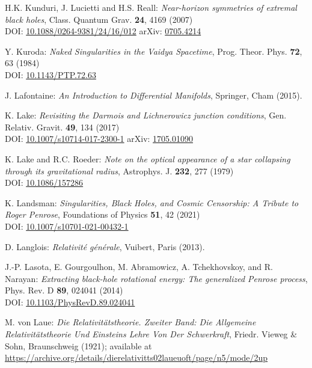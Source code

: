 \begin{thebibliography}{123}
H.K. Kunduri, J. Lucietti and H.S. Reall:
{\em Near-horizon symmetries of extremal black holes},
Class. Quantum Grav. {\bf 24}, 4169 (2007)\\
DOI: \href{https://doi.org/10.1088/0264-9381/24/16/012}{10.1088/0264-9381/24/16/012}\hfill
arXiv: \href{https://arxiv.org/abs/0705.4214}{0705.4214}

Y. Kuroda:
{\em Naked Singularities in the Vaidya Spacetime},
Prog. Theor. Phys. {\bf 72}, 63 (1984)\\
DOI: \href{https://doi.org/10.1143/PTP.72.63}{10.1143/PTP.72.63}

J. Lafontaine: {\em An Introduction to Differential Manifolds},
Springer, Cham (2015).

K. Lake:
{\em Revisiting the Darmois and Lichnerowicz junction conditions},
Gen. Relativ. Gravit. {\bf 49}, 134 (2017)\\
DOI: \href{https://doi.org/10.1007/s10714-017-2300-1}{10.1007/s10714-017-2300-1}\hfill
arXiv: \href{https://arxiv.org/abs/1705.01090}{1705.01090}

K. Lake and R.C. Roeder:
{\em Note on the optical appearance of a star collapsing through its gravitational radius},
Astrophys. J. {\bf 232}, 277 (1979)\\
DOI: \href{https://doi.org/10.1086/157286}{10.1086/157286}

K. Landsman:
{\em Singularities, Black Holes, and Cosmic Censorship:
A Tribute to Roger Penrose},
Foundations of Physics {\bf 51}, 42 (2021)\\
DOI: \href{https://doi.org/10.1007/s10701-021-00432-1}{10.1007/s10701-021-00432-1}

D. Langlois: \emph{Relativit\'e g\'en\'erale},
Vuibert, Paris (2013).

J.-P. Lasota, E. Gourgoulhon, M. Abramowicz, A. Tchekhovskoy,
and R. Narayan:
{\em Extracting black-hole rotational energy: The generalized Penrose process},
Phys. Rev. D {\bf 89}, 024041 (2014)  \\
DOI: \href{https://doi.org/10.1103/PhysRevD.89.024041}{10.1103/PhysRevD.89.024041}

M. von Laue: {\em Die Relativitätstheorie. Zweiter Band: Die Allgemeine Relativitätstheorie Und Einsteins Lehre Von Der Schwerkraft},
Friedr. Vieweg \& Sohn, Braunschweig (1921); available at \\
\url{https://archive.org/details/dierelativitts02laueuoft/page/n5/mode/2up}


\end{thebibliography}
